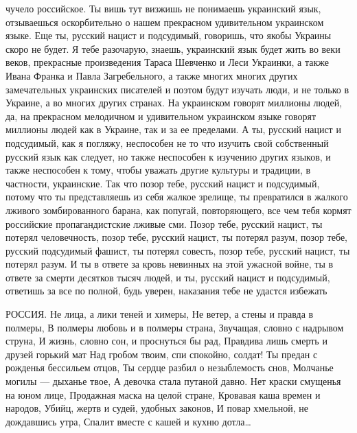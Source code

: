 чучело российское. Ты вишь тут визжишь не понимаешь украинский язык,
отзываешься оскорбительно о нашем прекрасном удивительном украинском языке. Еще
ты, русский нацист и подсудимый, говоришь, что якобы Украины скоро не будет. Я
тебе разочарую, знаешь, украинский язык будет жить во веки веков, прекрасные
произведения Тараса Шевченко и Леси Украинки, а также Ивана Франка и Павла
Загребельного, а также многих многих других замечательных украинских писателей
и поэтом будут изучать люди, и не только в Украине, а во многих других странах.
На украинском говорят миллионы людей, да, на прекрасном мелодичном и
удивительном украинском языке говорят миллионы людей как в Украине, так и за ее
пределами. А ты, русский нацист и подсудимый, как я погляжу, неспособен не то
что изучить свой собственный русский язык как следует, но также неспособен к
изучению других языков, и также неспособен к тому, чтобы уважать другие
культуры и традиции, в частности, украинские. Так что позор тебе, русский
нацист и подсудимый, потому что ты представляешь из себя жалкое зрелище, ты
превратился в жалкого лживого зомбированного барана, как попугай, повторяющего,
все чем тебя кормят российские пропагандистские лживые сми. Позор тебе, русский
нацист, ты потерял человечность, позор тебе, русский нацист, ты потерял разум,
позор тебе, русский подсудимый фашист, ты потерял совесть, позор тебе, русский
нацист, ты потерял разум. И ты в ответе за кровь невинных на этой ужасной
войне, ты в ответе за смерти десятков тысяч людей, и ты, русский нацист и
подсудимый, ответишь за все по полной, будь уверен, наказания тебе не удастся
избежать

РОССИЯ.
Не лица, а лики теней и химеры,
Не ветер, а стены и правда в полмеры,
В полмеры любовь и в полмеры страна,
Звучащая, словно с надрывом струна,
И жизнь, словно сон, и проснуться бы рад,
Правдива лишь смерть и друзей горький мат
Над гробом твоим, спи спокойно, солдат!
Ты предан с рожденья бессильем отцов,
Ты сердце разбил о незыблемость снов,
Молчанье могилы — дыханье твое,
А девочка стала путаной давно.
Нет краски смущенья на юном лице,
Продажная маска на целой стране,
Кровавая каша времен и народов,
Убийц, жертв и судей, удобных законов,
И повар хмельной, не дождавшись утра,
Спалит вместе с кашей и кухню дотла… 

